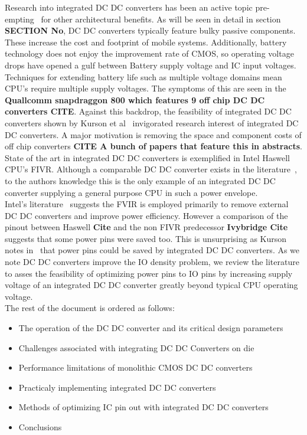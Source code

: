 \documentclass[letterpaper,twocolumn,10pt]{article}
\begin{document}
\indent Research into integrated DC DC converters has been an active topic pre-empting~\cite{Chang2010} for other architectural benefits. As will be seen in detail in section \textbf{SECTION No}, DC DC converters typically feature bulky passive components. These increase the cost and footprint of mobile systems. Additionally, battery technology does not enjoy the improvement rate of CMOS, so operating voltage drops have opened a gulf between Battery supply voltage and IC input voltages. Techniques for extending battery life such as multiple voltage domains mean CPU's require multiple supply voltages. The symptoms of this are seen in the \textbf{Quallcomm snapdraggon 800 which features 9 off chip DC DC converters CITE}. Against this backdrop, the feasibility of integrated DC DC converters shown by Kurson et al~\cite{Kurson2003} invigorated research interest of integrated DC DC converters. A major motivation is removing the space and component costs of off chip converters \textbf{CITE A bunch of papers that feature this in abstracts}.\\
\indent State of the art in integrated DC DC converters is exemplified in Intel Haswell CPU's FIVR. Although a comparable DC DC converter exists in the literature~\cite{Sturcken2012}, to the authors knowledge this is the only example of an integrated DC DC converter supplying a general purpose CPU in such a power envelope.\\
Intel's literature~\cite{Intel2010} %
suggests the FVIR is employed primarily to remove external DC DC converters and improve power efficiency. However a comparison of the pinout between Haswell \textbf{Cite} and the non FIVR predecessor \textbf{Ivybridge Cite} suggests that some power pins were saved too. This is unsurprising as Kurson notes in~\cite{Kurson2003} that power pins could be saved by integrated DC DC converters. As we note DC DC converters improve the IO density problem, we review the literature to asses the feasibility of optimizing power pins to IO pins by increasing supply voltage of an integrated DC DC converter greatly beyond typical CPU operating voltage.\\
\indent The rest of the document is ordered as follows:\\
\begin{itemize}
\item{The operation of the DC DC converter and its critical design parameters}
\item{Challenges associated with integrating DC DC Converters on die}
\item{Performance limitations of monolithic CMOS DC DC converters}
\item{Practicaly implementing integrated DC DC converters}
\item{Methods of optimizing IC pin out with integrated DC DC converters}
\item{Conclusions}
\end{itemize}
 
\end{document}
